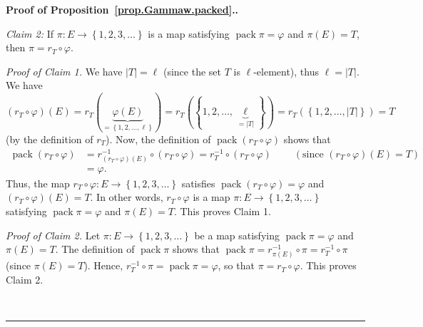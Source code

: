 \documentclass[numbers=enddot,12pt,final,onecolumn,notitlepage,abstracton]{scrartcl}%
\theoremstyle{definition}
\newenvironment{proof}[1][Proof]{\noindent\textbf{#1.} }{\ \rule{0.5em}{0.5em}}
\begin{document}
\begin{proof}[Proof of Proposition~\ref{prop.Gammaw.packed}.]
{\textit{Claim 2:} If $\pi:E\rightarrow\left\{  1,2,3,\ldots\right\}  $ is a
map satisfying $\operatorname{pack}\pi=\varphi$ and $\pi\left(  E\right)  =T$,
then $\pi=r_{T}\circ\varphi$.

\textit{Proof of Claim 1.} We have $\left|T\right| = \ell$ (since the set
$T$ is $\ell$-element), thus $\ell = \left|T\right|$.
We have $\left(  r_{T}\circ\varphi\right)  \left(
E\right)  =r_{T}\left(  \underbrace{\varphi\left(  E\right)  }_{=\left\{
1,2,\ldots,\ell\right\}  }\right)  =r_{T}\left(  \left\{  1,2,\ldots
,\underbrace{\ell}_{=\left\vert T\right\vert }\right\}  \right)
=r_{T}\left(  \left\{
1,2,\ldots,\left\vert T\right\vert \right\}  \right)  =T$ (by the definition
of $r_{T}$). Now, the definition of $\operatorname{pack}\left(  r_{T}%
\circ\varphi\right)  $ shows that
\begin{align*}
\operatorname{pack}\left(  r_{T}\circ\varphi\right)   & =r_{\left(  r_{T}%
\circ\varphi\right)  \left(  E\right)  }^{-1}\circ\left(  r_{T}\circ
\varphi\right)  =r_{T}^{-1}\circ\left(  r_{T}\circ\varphi\right)
\ \ \ \ \ \ \ \ \ \ \left(  \text{since }\left(  r_{T}\circ\varphi\right)
\left(  E\right)  =T\right) \\
& =\varphi.
\end{align*}
Thus, the map $r_{T}\circ\varphi:E\rightarrow\left\{  1,2,3,\ldots\right\}  $
satisfies $\operatorname{pack}\left(  r_{T}\circ\varphi\right)  =\varphi$ and
$\left(  r_{T}\circ\varphi\right)  \left(  E\right)  =T$. In other words,
$r_{T}\circ\varphi$ is a map $\pi:E\rightarrow\left\{  1,2,3,\ldots\right\}  $
satisfying $\operatorname{pack}\pi=\varphi$ and $\pi\left(  E\right)  =T$.
This proves Claim 1.

\textit{Proof of Claim 2.} Let $\pi:E\rightarrow\left\{  1,2,3,\ldots\right\}
$ be a map satisfying $\operatorname{pack}\pi=\varphi$ and $\pi\left(
E\right)  =T$. The definition of $\operatorname{pack}\pi$ shows that
$\operatorname{pack}\pi=r_{\pi\left(  E\right)  }^{-1}\circ\pi=r_{T}^{-1}%
\circ\pi$ (since $\pi\left(  E\right)  =T$). Hence, $r_{T}^{-1}\circ
\pi=\operatorname{pack}\pi=\varphi$, so that $\pi=r_{T}\circ\varphi$. This
proves Claim 2.

}
\end{proof}
\end{document}
